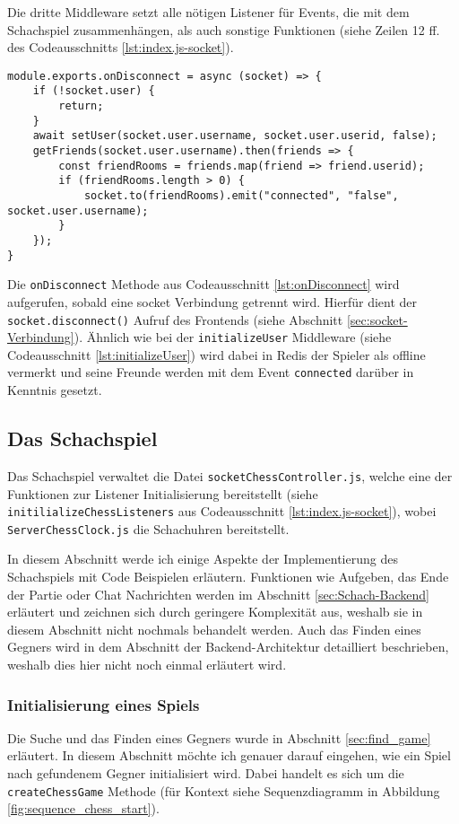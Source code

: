 Die dritte Middleware setzt alle nötigen Listener für Events, die mit dem Schachspiel zusammenhängen, als auch sonstige Funktionen (siehe Zeilen 12 ff. des Codeausschnitts \ref{lst:index.js-socket}).

\begin{lstlisting}[style=codeStyle, caption={Die onDisconnect Methode für Sockets}, label={lst:onDisconnect}]
module.exports.onDisconnect = async (socket) => {
    if (!socket.user) {
        return;
    }
    await setUser(socket.user.username, socket.user.userid, false);
    getFriends(socket.user.username).then(friends => {
        const friendRooms = friends.map(friend => friend.userid);
        if (friendRooms.length > 0) {
            socket.to(friendRooms).emit("connected", "false", socket.user.username);
        }
    });
}
\end{lstlisting}

Die \verb|onDisconnect| Methode aus Codeausschnitt \ref{lst:onDisconnect} wird aufgerufen, sobald eine socket Verbindung getrennt wird. Hierfür dient der \verb|socket.disconnect()| Aufruf des Frontends (siehe Abschnitt \ref{sec:socket-Verbindung}). Ähnlich wie bei der \verb|initializeUser| Middleware (siehe Codeausschnitt \ref{lst:initializeUser}) wird dabei in Redis der Spieler als offline vermerkt und seine Freunde werden mit dem Event \verb|connected| darüber in Kenntnis gesetzt.


\subsection{Das Schachspiel}
\label{sec:Schach-Backend-impl}
Das Schachspiel verwaltet die Datei \verb|socketChessController.js|, welche eine der Funktionen zur Listener Initialisierung bereitstellt (siehe \verb|initilializeChessListeners| aus Codeausschnitt \ref{lst:index.js-socket}), wobei \verb|ServerChessClock.js| die Schachuhren bereitstellt.

In diesem Abschnitt werde ich einige Aspekte der Implementierung des Schachspiels mit Code Beispielen erläutern. Funktionen wie Aufgeben, das Ende der Partie oder Chat Nachrichten werden im Abschnitt \ref{sec:Schach-Backend} erläutert und zeichnen sich durch geringere Komplexität aus, weshalb sie in diesem Abschnitt nicht nochmals behandelt werden. Auch das Finden eines Gegners wird in dem Abschnitt der Backend-Architektur detailliert beschrieben, weshalb dies hier nicht noch einmal erläutert wird.

\subsubsection{Initialisierung eines Spiels}
Die Suche und das Finden eines Gegners wurde in Abschnitt \ref{sec:find_game} erläutert. In diesem Abschnitt möchte ich genauer darauf eingehen, wie ein Spiel nach gefundenem Gegner initialisiert wird. Dabei handelt es sich um die \verb|createChessGame| Methode (für Kontext siehe Sequenzdiagramm in Abbildung \ref{fig:sequence_chess_start}).

